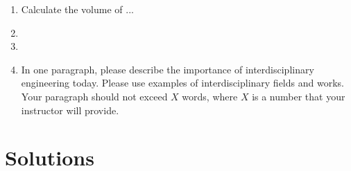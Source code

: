 \documentclass{article}
\begin{document}
\begin{enumerate}
\item %
Calculate the volume of ...
\item %

\item %

\item In one paragraph, please describe the importance of interdisciplinary engineering today. Please use examples of interdisciplinary fields and works. Your paragraph should not exceed $X$ words, where $X$ is a number that your instructor will provide. 
\end{enumerate} %
\newpage
\section*{Solutions}
\end{document}
